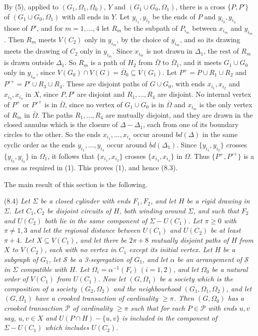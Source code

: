 {By (5), applied to $(G_1, \Omega_1, \Omega_0)$, $Y$ and $(G_1 \cup G_0, \Omega_1)$, there is a cross $\{P, P'\}$ of $(G_1 \cup G_0, \Omega_1)$ with all ends in $Y$. Let $y_{i_1}, y_{i_2}$ be the ends of $P$ and $y_{i_3}, y_{i_4}$ those of $P'$, and for $m = 1, \dots, 4$ let $R_m$ be the subpath of $P_{i_m}$ between $x_{i_m}$ and $y_{i_m}$. Then $R_m$ meets $V(C_2)$ only in $y_{i_m}$, by the choice of $y_{i_m}$, and so its drawing meets the drawing of $C_2$ only in $y_{i_m}$. Since $x_{i_m}$ is not drawn in $\Delta_1$, the rest of $R_m$ is drawn outside $\Delta_1$. So $R_m$ is a path of $H_2$ from $\bar{\Omega}$ to $\bar{\Omega}_1$, and it meets $G_1 \cup G_0$ only in $y_{i_m}$, since $V(G_0) \cap V(G) = \bar{\Omega}_0 \subseteq V(G_1)$. Let $P^+ = P \cup R_1 \cup R_2$ and $P'^+ = P' \cup R_3 \cup R_4$. These are disjoint paths of $G \cup G_0$, with ends $x_{i_1}, x_{i_2}$ and $x_{i_3}, x_{i_4}$ in $X$, since $P, P'$ are disjoint and $R_1, \dots, R_4$ are disjoint. No internal vertex of $P^+$ or $P'^+$ is in $\bar{\Omega}$, since no vertex of $G_1 \cup G_0$ is in $\bar{\Omega}$ and $x_{i_m}$ is the only vertex of $R_m$ in $\bar{\Omega}$. The paths $R_1, \dots, R_4$ are mutually disjoint, and they are drawn in the closed annulus which is the closure of $\Delta - \Delta_1$, each from one of its boundary circles to the other. So the ends $x_{i_1}, \dots, x_{i_4}$ occur around $bd(\Delta)$ in the same cyclic order as the ends $y_{i_1}, \dots, y_{i_4}$ occur around $bd(\Delta_1)$. Since $\{y_{i_1}, y_{i_2}\}$ crosses $\{y_{i_3}, y_{i_4}\}$ in $\Omega_1$, it follows that $\{x_{i_1}, x_{i_2}\}$ crosses $\{x_{i_3}, x_{i_4}\}$ in $\Omega$. Thus $\{P^+, P'^+\}$ is a cross as required in (1). This proves (1), and hence (8.3).}

The main result of this section is the following.

\stmt
(8.4) \textit{Let $\Sigma$ be a closed cylinder with ends $F_1, F_2$, and let $H$ be a rigid drawing in $\Sigma$. Let $C_1, C_2$ be disjoint circuits of $H$, both winding around $\Sigma$, and such that $F_2$ and $U(C_2)$ both lie in the same component of $\Sigma - U(C_1)$. Let $\pi \ge 0$ with $\pi \ne 1, 3$ and let the regional distance between $U(C_1)$ and $U(C_2)$ be at least $\pi + 4$. Let $X \subseteq V(C_1)$, and let there be $2\pi + 8$ mutually disjoint paths of $H$ from $X$ to $V(C_2)$, each with no vertex in $C_1$ except its initial vertex. Let $H$ be a subgraph of $G_1$, let $\mathscr{S}$ be a 3-segregation of $G_1$, and let $\alpha$ be an arrangement of $\mathscr{S}$ in $\Sigma$ compatible with $H$. Let $\Omega_i = \alpha^{-1}(F_i) \, (i = 1, 2)$, and let $\Omega_0$ be a natural order of $V(C_1)$ from $U(C_1)$. Now let $(G, \Omega_1)$ be a society which is the composition of a society $(G_2, \Omega_2)$ and the neighbourhood $(G_1, \Omega_1, \Omega_2)$, and let $(G, \Omega_1)$ have a crooked transaction of cardinality $\ge \pi$. Then $(G, \Omega_0)$ has a crooked transaction $\mathscr{P}$ of cardinality $\ge \pi$ such that for each $P \in \mathscr{P}$ with ends $u, v$ say, $u, v \in X$ and $U(P \cap H) - \{u, v\}$ is included in the component of $\Sigma - U(C_1)$ which includes $U(C_2)$.}

